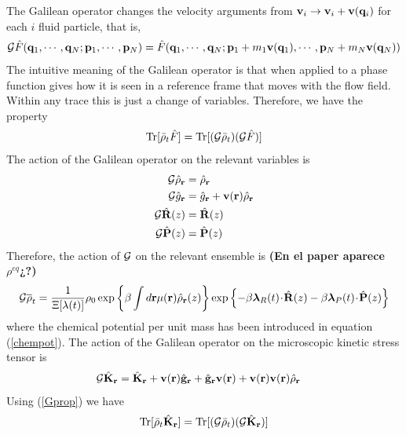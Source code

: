 \documentclass[b5paper,openright,10pt]{book}
\newcommand{\esc}{\!\cdot\!}
\newcommand{\Note}[1]{{\bf \color{red}#1}}    %
\begin{document}
The Galilean operator changes the velocity arguments from ${\bf v}_i\to {\bf v}_i+{\bf v}({\bf q}_i)$ for each $i$ fluid particle, that is,
\begin{align}
  {\cal G}\hat{F}({\bf q}_1,\cdots,{\bf q}_N;{\bf p}_1,\cdots,{\bf p}_N)
=\hat{F}({\bf q}_1,\cdots,{\bf q}_N;{\bf p}_1+m_1{\bf v}({\bf q}_1),\cdots,{\bf p}_N+m_N{\bf v}({\bf q}_N))
\end{align}
The intuitive meaning of the Galilean operator is that when applied to a phase function gives how it is seen in a reference frame that moves with the flow field. Within any trace this is just a change of variables. Therefore, we have the property
\begin{align}
  {\rm Tr}[\bar{\rho}_t\hat{F}] &= {\rm Tr}[({\cal G}\bar{\rho}_t)({\cal G}\hat{F})] \nonumber \\
  \label{Gprop}
\end{align}
The action of the Galilean operator on the relevant variables is
\begin{align}
  {\cal G}\hat{\rho}_{\bf r} &= \hat{\rho}_{\bf r} \nonumber\\
  {\cal G}\hat{g}_{\bf r} &= \hat{g}_{\bf r} + {\bf v}({\bf r})\hat{\rho}_{\bf r} \nonumber \\
  {\cal G}\hat{\bf R}(z) &= \hat{\bf R}(z) \nonumber\\
  {\cal G}\hat{\bf P}(z) &= \hat{\bf P}(z)
\end{align}
Therefore, the action of ${\cal G}$ on the relevant ensemble is \Note{(En el paper aparece $\rho^{eq}$¿?)}
\begin{align}
  {\cal G}\overline{\rho}_t =
\frac{1}{\Xi[\lambda(t)]}\rho_0
\exp\left\{\beta\int d{\bf r}\mu({\bf r})\hat{\rho}_{\bf r}(z)\right\}
\exp\left\{-\beta \boldsymbol{\lambda}_{R}(t)\esc\hat{\bf R}(z)
-\beta \boldsymbol{\lambda}_{P}(t)\esc\hat{\bf P}(z)\right\}
\label{resrelens}
\end{align}
where  the chemical  potential per  unit mass  has been  introduced in
equation  (\ref{chempot}). 
The  action  of the  Galilean  operator on  the
microscopic kinetic stress tensor is
\begin{align}
  {\cal G}\hat{{\bf K}}_{\bf r} &=
\hat{{\bf K}}_{\bf r} 
+{\bf v}({\bf r})\hat{\bf g}_{\bf r}
+\hat{\bf g}_{\bf r}{\bf v}({\bf r})
+{\bf v}({\bf r}){\bf v}({\bf r})\hat{\rho}_{\bf r}
\end{align}
Using (\ref{Gprop}) we have
\begin{align}
  {\rm Tr}[\bar{\rho}_t\hat{{\bf K}}_{\bf r}]={\rm Tr}[({\cal G}\bar{\rho}_t)({\cal G}\hat{{\bf K}}_{\bf r})]
\end{align}
\end{document}

